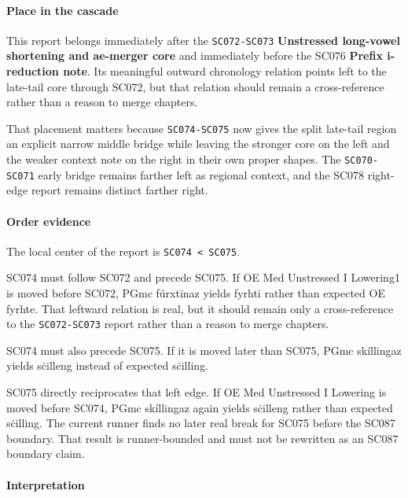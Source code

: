 \documentclass[
  british,
  a4paper,
]{article}
\begin{document}
\paragraph{Place in the cascade}\label{place-in-the-cascade-46}

This report belongs immediately after the \texttt{SC072-SC073}
\textbf{Unstressed long-vowel shortening and ae-merger core} and
immediately before the SC076 \textbf{Prefix i-reduction note}. Its
meaningful outward chronology relation points left to the late-tail core
through SC072, but that relation should remain a cross-reference rather
than a reason to merge chapters.

That placement matters because \texttt{SC074-SC075} now gives the split
late-tail region an explicit narrow middle bridge while leaving the
stronger core on the left and the weaker context note on the right in
their own proper shapes. The \texttt{SC070-SC071} early bridge remains
farther left as regional context, and the SC078 right-edge report
remains distinct farther right.

\paragraph{Order evidence}\label{order-evidence-46}

The local center of the report is \texttt{SC074\ \textless{}\ SC075}.

SC074 must follow SC072 and precede SC075. If OE Med Unstressed I
Lowering1 is moved before SC072, PGmc fúrxtīnaz yields fyrhti rather
than expected OE fyrhte. That leftward relation is real, but it should
remain only a cross-reference to the \texttt{SC072-SC073} report rather
than a reason to merge chapters.

SC074 must also precede SC075. If it is moved later than SC075, PGmc
skíllingaz yields sċilleng instead of expected sċilling.

SC075 directly reciprocates that left edge. If OE Med Unstressed I
Lowering is moved before SC074, PGmc skíllingaz again yields sċilleng
rather than expected sċilling. The current runner finds no later real
break for SC075 before the SC087 boundary. That result is runner-bounded
and must not be rewritten as an SC087 boundary claim.

\paragraph{Interpretation}\label{interpretation-46}
\end{document}
